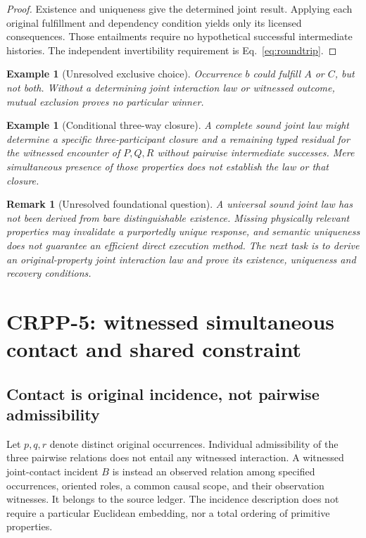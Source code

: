 \documentclass[11pt]{article}
\newtheorem{remark}[definition]{Remark}
\newtheorem{example}[definition]{Example}
\begin{document}
\begin{proof}
Existence and uniqueness give the determined joint result.
Applying each original fulfillment and dependency condition
yields only its licensed consequences. Those entailments
require no hypothetical successful intermediate histories.
The independent invertibility requirement is
Eq.~\eqref{eq:roundtrip}.
\end{proof}
\begin{example}[Unresolved exclusive choice]
Occurrence $b$ could fulfill $A$ or $C$, but not both.
Without a determining joint interaction law or witnessed
outcome, mutual exclusion proves no particular winner.
\end{example}
\begin{example}[Conditional three-way closure]
A complete sound joint law might determine a specific
three-participant closure and a remaining typed residual
for the witnessed encounter of $P,Q,R$ without pairwise
intermediate successes. Mere simultaneous presence of those
properties does not establish the law or that closure.
\end{example}
\begin{remark}[Unresolved foundational question]
A universal sound joint law has not been derived from bare
distinguishable existence. Missing physically relevant
properties may invalidate a purportedly unique response,
and semantic uniqueness does not guarantee an efficient
direct execution method. The next task is to derive an
original-property joint interaction law and prove its
existence, uniqueness and recovery conditions.
\end{remark}


\section{CRPP-5: witnessed simultaneous contact and shared constraint}
\label{sec:crpp5}

\subsection{Contact is original incidence, not pairwise admissibility}
Let $p,q,r$ denote distinct original occurrences. Individual
admissibility of the three pairwise relations does not entail
any witnessed interaction. A witnessed joint-contact incident
$B$ is instead an observed relation among specified occurrences,
oriented roles, a common causal scope, and their observation
witnesses. It belongs to the source ledger. The incidence
description does not require a particular Euclidean embedding,
nor a total ordering of primitive properties.
\end{document}
